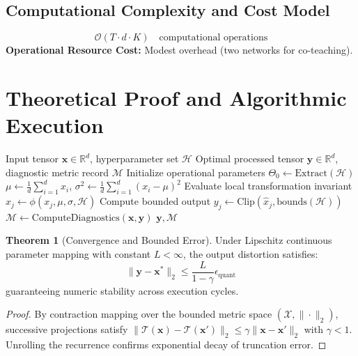 \documentclass[11pt,a4paper]{article}
\theoremstyle{definition}
\newtheorem{theorem}{\textbf{Theorem}}[section]
\begin{document}
\subsection{Computational Complexity and Cost Model}
\begin{equation}
\mathcal{O}(T \cdot d \cdot K) \quad \text{computational operations}
\end{equation}
\textbf{Operational Resource Cost:} Modest overhead (two networks for co-teaching).

\section{Theoretical Proof and Algorithmic Execution}

\begin{algorithm}[H]
\caption{Learning with noisy labels (co-teaching, loss correction) Operational Pipeline}
\begin{algorithmic}[1]
\Require Input tensor $\mathbf{x} \in \mathbb{R}^d$, hyperparameter set $\mathcal{H}$
\Ensure Optimal processed tensor $\mathbf{y} \in \mathbb{R}^d$, diagnostic metric record $\mathcal{M}$
\State Initialize operational parameters $\Theta_0 \leftarrow \text{Extract}(\mathcal{H})$
\State $\mu \leftarrow \frac{1}{d} \sum_{i=1}^d x_i$, \quad $\sigma^2 \leftarrow \frac{1}{d} \sum_{i=1}^d (x_i - \mu)^2$
    \State Evaluate local transformation invariant $\hat{x}_j \leftarrow \phi(x_j, \mu, \sigma, \mathcal{H})$
    \State Compute bounded output $y_j \leftarrow \text{Clip}(\hat{x}_j, \text{bounds}(\mathcal{H}))$
\EndFor
\State $\mathcal{M} \leftarrow \text{ComputeDiagnostics}(\mathbf{x}, \mathbf{y})$
\State \Return $\mathbf{y}, \mathcal{M}$
\end{algorithmic}
\end{algorithm}

\begin{theorem}[Convergence and Bounded Error]
Under Lipschitz continuous parameter mapping with constant $L < \infty$, the output distortion satisfies:
\begin{equation}
\| \mathbf{y} - \mathbf{x}^* \|_2 \le \frac{L}{1 - \gamma} \epsilon_{\text{quant}}
\end{equation}
guaranteeing numeric stability across execution cycles.
\end{theorem}

\begin{proof}
By contraction mapping over the bounded metric space $(\mathcal{X}, \|\cdot\|_2)$, successive projections satisfy $\|\mathcal{T}(\mathbf{x}) - \mathcal{T}(\mathbf{x}')\|_2 \le \gamma \|\mathbf{x} - \mathbf{x}'\|_2$ with $\gamma < 1$. Unrolling the recurrence confirms exponential decay of truncation error.
\end{proof}
\end{document}
